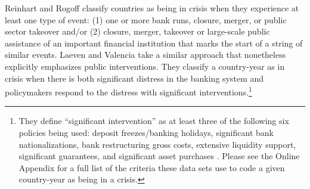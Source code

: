 \documentclass[]{article}
\begin{document}
Reinhart and Rogoff \citeyearpar[10]{Reinhart2009,ReinhartRog2010} classify countries as being in crisis when they experience at least one type of event: (1) one or more bank runs, closure, merger, or public sector takeover and/or (2) closure, merger, takeover or large-scale public assistance of an important financial institution that marks the start of a string of similar events. Laeven and Valencia \citeyearpar[228]{laeven2013} take a similar approach that nonetheless explicitly emphasizes public interventions. They classify a country-year as in crisis when there is both significant distress in the banking system and policymakers respond to the distress with significant interventions.\footnote{They define ``significant intervention'' as at least three of the following six policies being used: deposit freezes/banking holidays, significant bank nationalizations, bank restructuring gross costs, extensive liquidity support, significant guarantees, and significant asset purchases \cite[][229]{laeven2013}. Please see the Online Appendix for a full list of the criteria these data sets use to code a given country-year as being in a crisis.}
\end{document}
